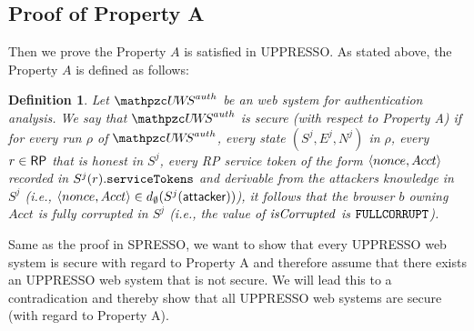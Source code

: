 \documentclass[letterpaper,onecolumn,10pt]{article}
\newtheorem{definition}{Definition}
\begin{document}
\subsection{Proof of Property A}
Then we prove the Property $A$ is satisfied in UPPRESSO.
As stated above, the Property $A$ is defined as follows:
\begin{definition}\label{def:uppresso-security-property} 
  Let $\uppressoauthwebsystem$ be an \uppresso web system 
  for authentication analysis. We say that 
  \emph{$\uppressoauthwebsystem$ is secure 
  (with respect to Property A)} if for every run $\rho$ of 
  $\uppressoauthwebsystem$, every state $(S^j, E^j, N^j)$ in 
  $\rho$, every $r\in \mathsf{RP}$ that is honest in $S^j$, 
  every RP service token of the form $\langle {{}nonce, Acct} \rangle$ 
  recorded in $S^j(r).\mathtt{serviceTokens}$ and derivable 
  from the attackers knowledge in $S^j$ (i.e., 
  $\langle {{}nonce, Acct} \rangle \in 
  d_{\emptyset}(S^j(\mathsf{attacker}))$), it follows that the 
  browser $b$ owning $Acct$ is fully corrupted in $S^j$ 
  (i.e., the value of $\mathit{isCorrupted}$ is $\mathtt{FULLCORRUPT}$). 
\end{definition}



Same as the proof in SPRESSO, we want to show that every UPPRESSO web system is secure with regard to Property A and therefore assume that there exists an UPPRESSO web system that is not secure. We will lead this to a contradication and thereby show that all UPPRESSO web systems are secure (with regard to Property A).

\end{document}
